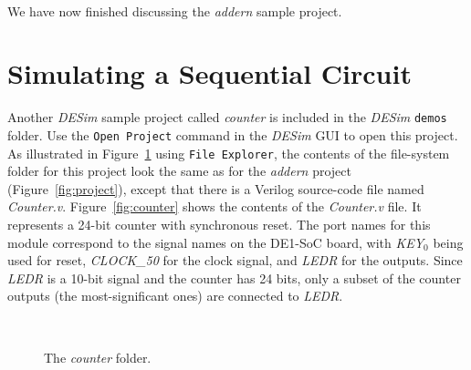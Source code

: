\documentclass[epsfig,10pt,fullpage]{article} \addtolength{\textwidth}{1.5in}
\begin{document}
~\\
\noindent
We have now finished discussing the {\it addern} sample project.

\section*{Simulating a Sequential Circuit}

Another {\it DESim} sample project called {\it counter} is included in the {\it DESim}
\texttt{demos} folder. Use the \texttt{Open Project} command in the {\it DESim} GUI to open this
project. As illustrated in Figure~\ref{fig:project2} using \texttt{File Explorer}, the
contents of the file-system folder for this project look the same as for the 
{\it addern} project (Figure~\ref{fig:project}), except that there is a Verilog
source-code file named {\it Counter.v}. Figure~\ref{fig:counter}
shows the contents of the {\it Counter.v} file. It represents a 24-bit counter with synchronous
reset. The port names for this module correspond to the signal names 
on the DE1-SoC board, with {\it KEY}$_0$ being used for reset, {\it CLOCK\_50} for the 
clock signal, and {\it LEDR} for the outputs. Since {\it LEDR} is a 10-bit signal and the 
counter has 24 bits, only a subset of the counter outputs (the most-significant ones) are 
connected to {\it LEDR}. 

~\\
\begin{figure}[h]
	\begin{center}
        \setlength{\fboxsep}{0pt}
	\end{center}
		  \caption{The {\it counter} folder.}
	\label{fig:project2}
\end{figure}
\end{document}
